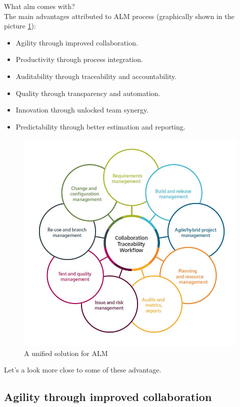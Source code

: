 \documentclass[thesis=M,english]{FITthesis}[2012/06/26]
\begin{document}
What \acrshort{alm} comes with?\\

The main advantages attributed to ALM process (graphically shown in the picture \ref{fig:alm_unified_solutionc}):
\begin{itemize}[nosep]
\item Agility through improved collaboration.
\item Productivity through process integration.
\item Auditability through traceability and accountability.
\item Quality through transparency and automation.
\item Innovation through unlocked team synergy.
\item Predictability through better estimation and reporting.\\
\end{itemize}

\begin{figure}[h!]\centering
	\includegraphics[width=1\textwidth]{pictures/alm_unified_processes}
	\caption{A unified solution for ALM \cite{polarion_alm}}\label{fig:alm_unified_solutionc}
\end{figure}

Let's a look more close to some of these advantage.

\subsection{Agility through improved collaboration}
\end{document}
